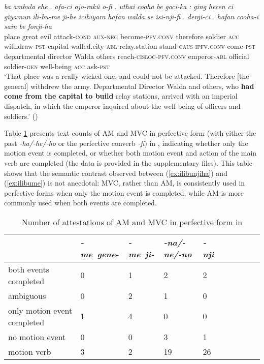 \documentclass{article}
\newcommand{\ipa}[1]{\textit{{\phon\mbox{#1}}}} %
\begin{document}
\begin{exe}
\ex \label{ex:ilibume}
\gll
\ipa{ba} 	\ipa{ambula} 	\ipa{ehe} 	\ipa{.} 	\ipa{afa-ci} 	\ipa{ojo-rakû} 	\ipa{o-fi} 	\ipa{.} 	\ipa{uthai} 	\ipa{cooha} 	\ipa{be} 	\ipa{goci-ka} 	\ipa{:} 	\ipa{ging} 	\ipa{hecen} 	\ipa{ci} 	\ipa{giyamun} 	\ipa{ili-bu-me} 	\ipa{ji-he} 	\ipa{icihiyara} 	\ipa{hafan} 	\ipa{walda} 	\ipa{se} 	\ipa{isi-nji-fi} 	\ipa{.} 	\ipa{dergi-ci} 	\ipa{.} 	\ipa{hafan} 	\ipa{cooha-i} 	\ipa{sain} 	\ipa{be} 	\ipa{fonji-ha} \\
place great evil { } attack-\textsc{cond} \textsc{aux-neg} become-\textsc{pfv.conv} { } therefore soldier \textsc{acc} withdraw-\textsc{pst} { } capital walled.city \textsc{abl} relay.station stand-\textsc{caus-ipfv.conv} come-\textsc{pst} departmental director Walda others reach-\textsc{cisloc-pfv.conv} { } emperor-\textsc{abl} { } official soldier-\textsc{gen} well-being \textsc{acc} ask-\textsc{pst} \\
\glt `That place was a really wicked one, and could not be attacked. Therefore [the general] withdrew the army. Departmental Director Walda and others, who \textbf{had come from the capital to build} relay stations, arrived with an imperial dispatch, in which the emperor inquired about the well-being of officers and soldiers.' (\citealt[94/62]{cosmo06dzengseo})
\end{exe}

Table \ref{tab:counts.dzengsheo} presents text counts of AM and MVC in perfective form (with either the past \ipa{-ha/-he/-ho} or the perfective converb \ipa{-fi}) in \citet{cosmo06dzengseo}, indicating whether only the motion event is completed, or whether both motion event and action of the main verb are completed (the data is provided in the supplementary files). This table shows that the semantic contrast observed between (\ref{ex:ilibunjiha}) and (\ref{ex:ilibume}) is not anecdotal: MVC, rather than AM,  is consistently used in perfective forms when only the motion event is completed, while AM is more commonly used when both events are completed.


\begin{table}[h]
\caption{Number of attestations of AM and MVC in perfective form in \citet{cosmo06dzengseo} } \centering \label{tab:counts.dzengsheo}
\begin{tabular}{llllllllll}
\toprule
 & 	\ipa{-me gene-} & 	\ipa{-me ji-} & 	\ipa{-na/-ne/-no} & 	\ipa{-nji} & 	\\
 \midrule
both events completed & 	0 & 	1 & 	2 & 	2 & 	\\
ambiguous & 	0 & 	2 & 	1 & 	0 & 	\\
only motion event completed & 	1 & 	4 & 	0 & 	0 & 	\\
no motion event & 	0 & 	0 & 	3 & 	1 & 	\\
motion verb & 	3 & 	2 & 	19 & 	26 & 	\\
\bottomrule
\end{tabular}
\end{table}
\end{document}
